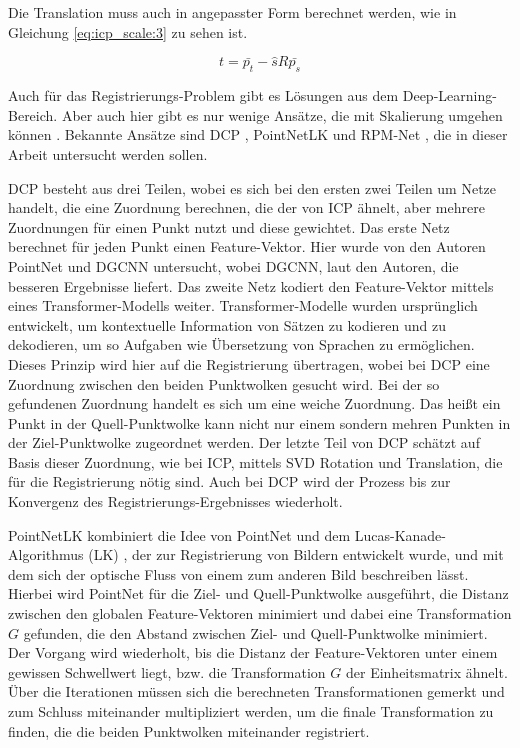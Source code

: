 \documentclass[12pt,titlepage, twoside]{article}
\begin{document}
Die Translation muss auch in angepasster Form berechnet werden, wie in Gleichung \ref{eq:icp_scale:3} zu sehen ist.

\begin{equation}
    \label{eq:icp_scale:3}
    t = \bar{p_t} - \hat{s}  R \bar{p_s}
\end{equation}

Auch für das Registrierungs-Problem gibt es Lösungen aus dem Deep-Learning-Bereich. Aber auch hier gibt es nur wenige Ansätze, die mit Skalierung umgehen können \cite{ScaleLK}.
Bekannte Ansätze sind DCP \cite{Wang_2019_ICCV}, PointNetLK \cite{aoki2019pointnetlk} und RPM-Net \cite{Yew_2020}, die in dieser Arbeit untersucht werden sollen.

DCP besteht aus drei Teilen, wobei es sich bei den ersten zwei Teilen um Netze handelt, die eine Zuordnung berechnen, die der von ICP ähnelt, aber mehrere Zuordnungen für einen Punkt nutzt und diese gewichtet.
Das erste Netz berechnet für jeden Punkt einen Feature-Vektor. Hier wurde von den Autoren PointNet und DGCNN untersucht, wobei DGCNN, laut den Autoren, die besseren Ergebnisse liefert. 
Das zweite Netz kodiert den Feature-Vektor mittels eines Transformer-Modells weiter. 
Transformer-Modelle wurden ursprünglich entwickelt, um kontextuelle Information von Sätzen zu kodieren und zu dekodieren, um so Aufgaben wie Übersetzung von Sprachen zu ermöglichen. 
Dieses Prinzip wird hier auf die Registrierung übertragen, wobei bei DCP eine Zuordnung zwischen den beiden Punktwolken gesucht wird.
Bei der so gefundenen Zuordnung handelt es sich um eine weiche Zuordnung. Das heißt ein Punkt in der Quell-Punktwolke kann nicht nur einem sondern mehren Punkten in der Ziel-Punktwolke zugeordnet werden.
Der letzte Teil von DCP schätzt auf Basis dieser Zuordnung, wie bei ICP, mittels SVD Rotation und Translation, die für die Registrierung nötig sind.
Auch bei DCP wird der Prozess bis zur Konvergenz des Registrierungs-Ergebnisses wiederholt.

PointNetLK kombiniert die Idee von PointNet und dem Lucas-Kanade-Algorithmus (LK) \cite{lk}, der zur Registrierung von Bildern entwickelt wurde, und mit dem sich der optische Fluss von einem zum anderen Bild beschreiben lässt. 
Hierbei wird PointNet für die Ziel- und Quell-Punktwolke ausgeführt, die Distanz zwischen den globalen Feature-Vektoren minimiert und 
dabei eine Transformation $G$ gefunden, die den Abstand zwischen Ziel- und Quell-Punktwolke minimiert.
Der Vorgang wird wiederholt, bis die Distanz der Feature-Vektoren unter einem gewissen Schwellwert liegt, bzw. die Transformation $G$ der Einheitsmatrix ähnelt.
Über die Iterationen müssen sich die berechneten Transformationen gemerkt und zum Schluss miteinander multipliziert werden, um die finale Transformation zu finden, die die beiden Punktwolken miteinander registriert.
\end{document}
